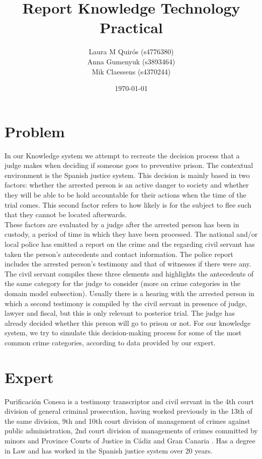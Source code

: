 \documentclass{article}
\title{Report Knowledge Technology Practical}
\author{Laura M Quirós (s4776380) \\ Anna Gumenyuk (s3893464) \\ Mik Claessens (s4370244)}
\date{\today}
\begin{document}
\maketitle

\section{Problem}
In our Knowledge system we attempt to recreate the decision process that a judge makes when deciding if someone goes to preventive prison. The contextual environment is the Spanish justice system. This decision is mainly based in two factors: whether the arrested person is an active danger to society and whether they will be able to be hold accountable for their actions when the time of the trial comes. This second factor refers to how likely is for the subject to flee such that they cannot be located afterwards. \\
These factors are evaluated by a judge after the arrested person has been in custody, a period of time in which they have been processed. The national and/or local police has emitted a report on the crime and the regarding civil servant has taken the person's antecedents and contact information. The police report includes the arrested person's testimony and that of witnesses if there were any. \\
The civil servant compiles these three elements and highlights the antecedents of the same category for the judge to consider (more on crime categories in the domain model subsection). Usually there is a hearing with the arrested person in which a second testimony is compiled by the civil servant in presence of judge, lawyer and fiscal, but this is only relevant to posterior trial. The judge has already decided whether this person will go to prison or not.
For our knowledge system, we try to simulate this decision-making process for some of the most common crime categories, according to data provided by our expert.

\section{Expert}
Purificación Conesa is a testimony transcriptor and civil servant in the 4th court division of general criminal prosecution, having worked previously in the 13th of the same division, 9th and 10th court division of management of crimes against public administration, 2nd court division of managements of crimes committed by minors and Province Courts of Justice in Cádiz and Gran Canaria . Has a degree in Law and has worked in the Spanish justice system over 20 years.
\end{document}
